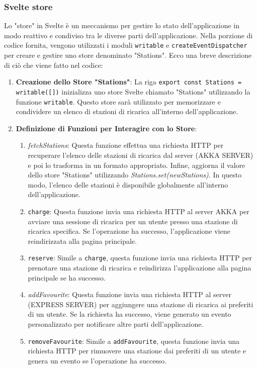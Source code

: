 \subsubsection{Svelte store}
Lo "store" in Svelte è un meccanismo per gestire lo stato dell'applicazione in modo reattivo e condiviso tra le diverse parti dell'applicazione. Nella porzione di codice fornita, vengono utilizzati i moduli \texttt{writable} e \texttt{createEventDispatcher} per creare e gestire uno store denominato "Stations". Ecco una breve descrizione di ciò che viene fatto nel codice:
\begin{enumerate}[label=\arabic*.]
      \item \textbf{Creazione dello Store "Stations"}: La riga
            \texttt{export const Stations = writable([])} inizializza uno store
            Svelte chiamato "Stations" utilizzando la funzione \texttt{writable}.
            Questo store sarà utilizzato per memorizzare e condividere un elenco
            di stazioni di ricarica all'interno dell'applicazione.

      \item \textbf{Definizione di Funzioni per Interagire con lo Store}:
            \begin{enumerate}[label=\arabic{enumi}.\arabic*]
                  \item \textit{fetchStations}: Questa funzione effettua una richiesta
                        HTTP per recuperare l'elenco delle stazioni di ricarica dal server (AKKA SERVER)
                        e poi lo trasforma in un formato appropriato. Infine, aggiorna il valore dello
                        store "Stations" utilizzando \textit{Stations.set(newStations)}. In questo modo,
                        l'elenco delle stazioni è disponibile globalmente all'interno dell'applicazione.

                  \item \texttt{charge}: Questa funzione invia una richiesta HTTP al server AKKA per avviare una sessione di ricarica per un utente presso una stazione di ricarica specifica. Se l'operazione ha successo, l'applicazione viene reindirizzata alla pagina principale.

                  \item \texttt{reserve}: Simile a \texttt{charge}, questa funzione invia una richiesta HTTP per prenotare una stazione di ricarica e reindirizza l'applicazione alla pagina principale se ha successo.
                  \item \textit{addFavourite}: Questa funzione invia una
                        richiesta HTTP al server (EXPRESS SERVER) per aggiungere una stazione
                        di ricarica ai preferiti di un utente. Se la richiesta ha successo, viene
                        generato un evento personalizzato per notificare altre parti dell'applicazione.

                  \item \texttt{removeFavourite}: Simile a \texttt{addFavourite}, questa funzione invia una richiesta HTTP per rimuovere una stazione dai preferiti di un utente e genera un evento se l'operazione ha successo.
            \end{enumerate}
\end{enumerate}


